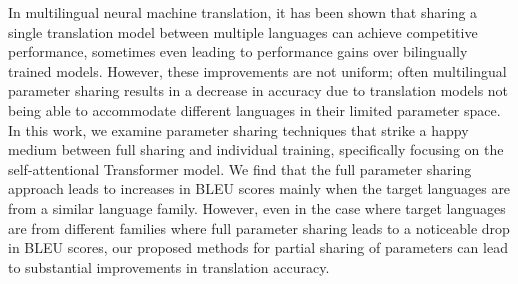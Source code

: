 In multilingual neural machine translation, it has been shown that sharing a single translation model between multiple languages can achieve competitive performance, sometimes even leading to performance gains over bilingually trained models. However, these improvements are not uniform; often multilingual parameter sharing results in a decrease in accuracy due to translation models not being able to accommodate different languages in their limited parameter space. In this work, we examine parameter sharing techniques that strike a happy medium between full sharing and individual training, specifically focusing on the self-attentional Transformer model. We find that the full parameter sharing approach leads to increases in BLEU scores mainly when the target languages are from a similar language family. However, even in the case where target languages are from different families where full parameter sharing leads to a noticeable drop in BLEU scores, our proposed methods for partial sharing of parameters can lead to substantial improvements in translation accuracy.
